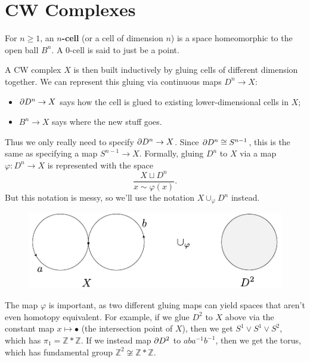\documentclass[twoside,10pt]{report}
\begin{document}
\tableofcontents

\section{CW Complexes}

For $n \geq 1$, an \textbf{$n$-cell} (or a cell of dimension $n$) is a space homeomorphic to the open ball $B^{n}$. A 0-cell is said to just be a point.



A CW complex $X$ is then built inductively by gluing cells of different dimension together. We can represent this gluing via continuous maps $D^{n}\to X$:
\begin{itemize}
	\item $\partial D^{n}\to X$ says how the cell is glued to existing lower-dimensional cells in $X$;
	\item $B^{n}\to X$ says where the new stuff goes.
\end{itemize}
Thus we only really need to specify $\partial D^{n}\to X$. Since $\partial D^{n} \cong S^{n-1}$, this is the same as specifying a map $S^{n-1}\to X$. Formally, gluing $D^{n}$ to $X$ via a map $\varphi:D^{n}\to X$ is represented with the space
\[
	\frac{X \sqcup D^{n}}{x \sim \varphi(x)}.
\] But this notation is messy, so we'll use the notation $X \cup_{\varphi}D^{n}$ instead.

\begin{figure}[H]
	\centering
	\includegraphics[scale=1]{fig/glue-not-htpy-equiv.pdf}
\end{figure}

The map $\varphi$ is important, as two different gluing maps can yield spaces that aren't even homotopy equivalent. For example, if we glue $D^{2}$ to $X$ above via the constant map $x \mapsto \bullet$ (the intersection point of $X$), then we get $S^{1}\vee S^{1}\vee S^{2}$, which has $\pi_1 = \mathbb{Z} * \mathbb{Z}$. If we instead map $\partial D^2$ to $aba^{-1}b^{-1}$, then we get the torus, which has fundamental group $\mathbb{Z}^2 \not\cong \mathbb{Z}*\mathbb{Z}$.
\end{document}
